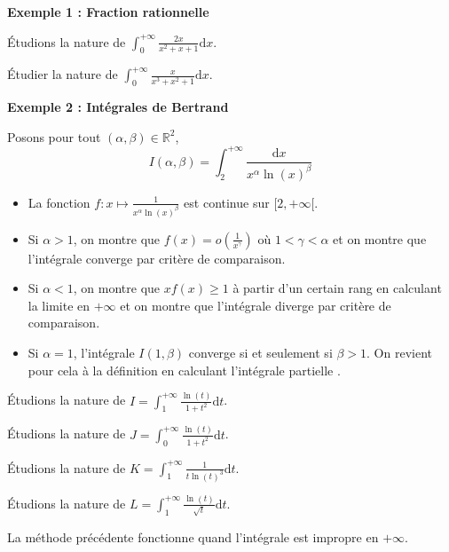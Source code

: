 \documentclass[french,11pt,twoside]{VcCours}
\newcommand{\dx}{\text{d}x}
\newcommand{\dt}{\text{d}t}
\begin{document}
\textbf{Exemple 1 : Fraction rationnelle}

Étudions la nature de $\int_{0}^{+ \infty} \frac{2x}{x^2+x+1} \dx$.

\vspace{5cm}

\begin{ApplicationDirecte}{} Étudier la nature de $\int_{0}^{+ \infty} \frac{x}{x^3+x^2+1} \dx$.
\end{ApplicationDirecte}

\textbf{Exemple 2 : Intégrales de Bertrand}

Posons pour tout $(\alpha, \beta) \in \mathbb{R}^2$, 
$$ I(\alpha, \beta) = \int_{2}^{+ \infty} \frac{\dx}{x^{\alpha} \ln(x)^{\beta}}$$

\begin{itemize}
\item La fonction $f: x \mapsto \frac{1}{x^{\alpha} \ln(x)^{\beta}}$ est continue sur $[2, + \infty[$.
\item Si $\alpha>1$, on montre que $f(x)=o \left( \frac{1}{x^{\gamma}} \right)$ où $1 < \gamma < \alpha$ et on montre que l'intégrale converge par critère de comparaison.
\item Si $\alpha<1$, on montre que $xf(x) \geq 1$ à partir d'un certain rang en calculant la limite en $+ \infty$ et on montre que l'intégrale diverge par critère de comparaison.
\item Si $\alpha=1$, l'intégrale $I(1, \beta)$ converge si et seulement si $\beta>1$. On revient pour cela à la définition en calculant \og l'intégrale partielle \fg .
\end{itemize}

\newpage
Étudions la nature de $I=\int_{1}^{+ \infty} \frac{\ln(t)}{1+t^2} \dt$.

\vspace{5cm}

Étudions la nature de $J=\int_{0}^{+ \infty} \frac{\ln(t)}{1+t^2} \dt$.

\vspace{5cm}

Étudions la nature de $K=\int_{1}^{+ \infty} \frac{1}{t \ln(t)^3} \dt$.

\vspace{5cm}

Étudions la nature de $L=\int_{1}^{+ \infty} \frac{\ln(t)}{\sqrt{t}} \dt$.

\vspace{5cm}

\begin{Remarque}[\alerte]{} La méthode précédente fonctionne quand l'intégrale est impropre en $+ \infty$.
\end{Remarque}
\end{document}
